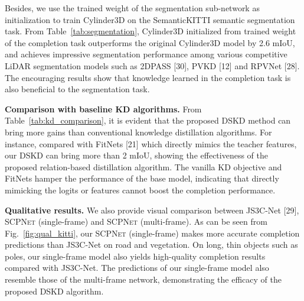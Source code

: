 \documentclass[10pt,twocolumn,letterpaper]{article}
\newcommand{\methodname}{\textsc{SCPNet}}
\begin{document}
Besides, we use the trained weight of the segmentation sub-network as initialization to train Cylinder3D on the SemanticKITTI semantic segmentation task. From Table~\ref{tab:segmentation}, Cylinder3D initialized from trained weight of the completion task outperforms the original Cylinder3D model by 2.6 mIoU, and achieves impressive segmentation performance among various competitive LiDAR segmentation models such as 2DPASS [30], PVKD [12] and RPVNet [28]. The encouraging results show that knowledge learned in the completion task is also beneficial to the segmentation task.

\textbf{Comparison with baseline KD algorithms.}
From Table~\ref{tab:kd_comparison}, it is evident that the proposed DSKD method can bring more gains than conventional knowledge distillation algorithms. For instance, compared with FitNets [21] which directly mimics the teacher features, our DSKD can bring more than 2 mIoU, showing the effectiveness of the proposed relation-based distillation algorithm. The vanilla KD objective and FitNets hamper the performance of the base model, indicating that directly mimicking the logits or features cannot boost the completion performance.

\textbf{Qualitative results.}
We also provide visual comparison between JS3C-Net [29], \methodname{} (single-frame) and \methodname{} (multi-frame). As can be seen from Fig.~\ref{fig:qual_kitti}, our \methodname{} (single-frame) makes more accurate completion predictions than JS3C-Net on road and vegetation. On long, thin objects such as poles, our single-frame model also yields high-quality completion results compared with JS3C-Net. The predictions of our single-frame model also resemble those of the multi-frame network, demonstrating the efficacy of the proposed DSKD algorithm.
\end{document}
